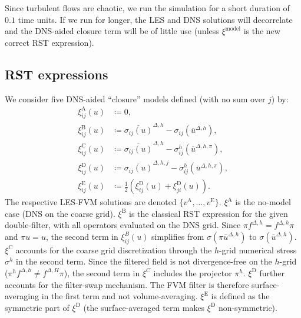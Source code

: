 \documentclass[preprint,twocolumn,5p]{elsarticle}
\begin{document}
Since turbulent flows are chaotic, we run the simulation for a short duration
of $0.1$ time units.
If we run for longer, the LES and DNS solutions will
decorrelate
and the DNS-aided closure term will be of little use
(unless $\xi^\text{model}$ is the new correct RST expression).

\subsection{RST expressions} \label{sec:RST-expressions}

We consider five DNS-aided ``closure'' models
defined (with no sum over $j$) by:
\begin{align}
    \xi^\text{A}_{i j}(u)
    & \coloneq 0, \\
    \xi^\text{B}_{i j}(u)
    & \coloneq
    \overline{\sigma_{i j}(u)}^{\Delta, h}  -
    \sigma_{i j}\left(\overline{u}^{\Delta, h}\right), \\
    \xi^\text{C}_{i j}(u)
    & \coloneq
    \overline{\sigma_{i j}(u)}^{\Delta, h}  -
    \sigma^h_{i j}\left(\overline{u}^{\Delta, h, \pi}\right), \\
    \xi^\text{D}_{i j}(u)
    & \coloneq
    \overline{\sigma_{i j}(u)}^{\Delta, h, j} -
    \sigma^h_{i j}\left(\overline{u}^{\Delta, h, \pi}\right), \\
    \xi^\text{E}_{i j}(u)
    & \coloneq
    \frac{1}{2} \left(
        \xi^\text{D}_{i j}(u) +
        \xi^\text{D}_{j i}(u)
    \right).
\end{align}
The respective LES-FVM solutions are denoted
$\{v^\text{A}, \dots, v^\text{E}\}$.
$\xi^\text{A}$ is the no-model case (DNS on the coarse grid).
$\xi^\text{B}$ is the classical RST expression for the given double-filter,
with all operators evaluated on the DNS grid.
Since $\pi f^{\Delta, h} = f^{\Delta, h} \pi$ and
$\pi u = u$,
the second term in $\xi^B_{i j}(u)$ simplifies from
$\sigma( \pi \bar{u}^{\Delta, h})$ to
$\sigma( \bar{u}^{\Delta, h})$.
$\xi^\text{C}$ accounts for the coarse grid discretization through the $h$-grid
numerical stress $\sigma^h$ in the second term.
Since the filtered field is not divergence-free on the $h$-grid
($\pi^h f^{\Delta, h} \neq f^{\Delta, H} \pi$),
the second term in $\xi^C$ includes the 
projector $\pi^h$. $\xi^\text{D}$ further accounts for the filter-swap
mechanism. The FVM filter is therefore surface-averaging in the first term and
not volume-averaging. $\xi^\text{E}$ is defined as the symmetric part of
$\xi^\text{D}$ (the surface-averaged term makes $\xi^\text{D}$
non-symmetric).
\end{document}
